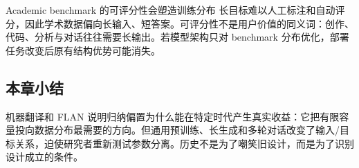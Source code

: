 \begin{warningbox}{Academic benchmark 的可评分性会塑造训练分布}
长目标难以人工标注和自动评分，因此学术数据偏向长输入、短答案。可评分性不是用户价值的同义词：创作、代码、分析与对话往往需要长输出。若模型架构只对 benchmark 分布优化，部署任务改变后原有结构优势可能消失。
\end{warningbox}

\subsection{本章小结}

机器翻译和 FLAN 说明归纳偏置为什么能在特定时代产生真实收益：它把有限容量投向数据分布最需要的方向。但通用预训练、长生成和多轮对话改变了输入/目标关系，迫使研究者重新测试参数分离。历史不是为了嘲笑旧设计，而是为了识别设计成立的条件。

